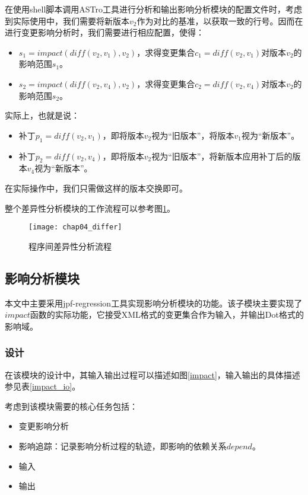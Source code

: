 在使用shell脚本调用ASTro工具进行分析和输出影响分析模块的配置文件时，考虑到实际使用中，我们需要将新版本$v_2$作为对比的基准，以获取一致的行号。因而在进行变更影响分析时，我们需要进行相应配置，使得：
\begin{itemize}
	\item $s_1 = impact(diff(v_2,v_1),v_2)$，求得变更集合$c_1 = diff(v_2,v_1)$对版本$v_2$的影响范围$s_1$。
	\item $s_2 = impact(diff(v_2,v_4),v_2)$，求得变更集合$c_2 = diff(v_2,v_4)$对版本$v_2$的影响范围$s_2$。
\end{itemize}

实际上，也就是说：
\begin{itemize}
	\item 补丁$p_1 = diff(v_2,v_1)$，即将版本$v_2$视为“旧版本”，将版本$v_1$视为“新版本”。
	\item 补丁$p_2 = diff(v_2,v_4)$，即将版本$v_2$视为“旧版本”，将新版本应用补丁后的版本$v_4$视为“新版本”。
\end{itemize}

在实际操作中，我们只需做这样的版本交换即可。

整个差异性分析模块的工作流程可以参考图\ref {diff}。

\begin{figure}[H]
	\centering
	\texttt{[image: chap04\_differ]}
	\caption {程序间差异性分析流程}
	\label {diff}	
\end{figure}

\subsection{影响分析模块}

本文中主要采用jpf-regression工具实现影响分析模块的功能。该子模块主要实现了$impact$函数的实际功能，它接受XML格式的变更集合作为输入，并输出Dot格式的影响域。

\subsubsection{设计}

在该模块的设计中，其输入输出过程可以描述如图\ref {impact}，输入输出的具体描述参见表\ref {impact_io}。

考虑到该模块需要的核心任务包括：
\begin{itemize}
	\item 变更影响分析
	\item 影响追踪：记录影响分析过程的轨迹，即影响的依赖关系$depend$。
	\item 输入
	\item 输出
\end{itemize}

